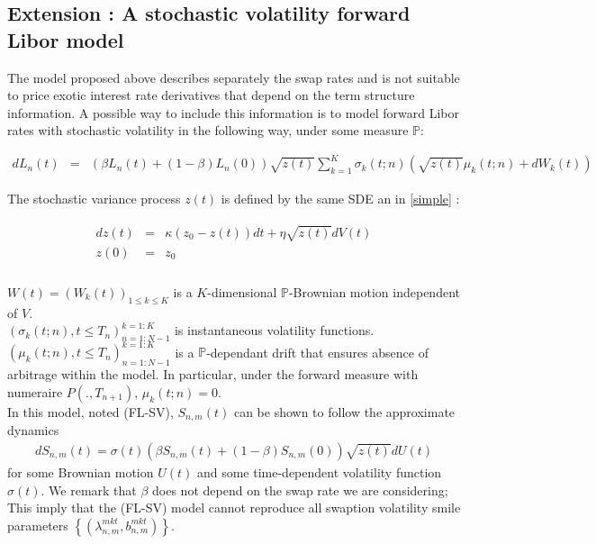 \documentclass[12pt,a4paper]{article}
\def\P{{\mathbb P}}
\begin{document}
\subsection{Extension : A stochastic volatility forward Libor model}

The model proposed above describes separately the swap rates and is not suitable to price exotic interest rate derivatives that depend on the term structure information. A possible way to include this information is to model forward Libor rates with stochastic volatility in the following way, under some measure $\P$:

\begin{eqnarray}
\label{FLSV}
d L_n(t)&=&\left(\beta L_n(t) + (1-\beta) L_n(0)\right) \sqrt{z(t)} \sum_{k=1}^{K}\sigma_k(t; n)\left(\sqrt{z(t)}\mu_k(t; n) + dW_k(t)\right)
\end{eqnarray}

The stochastic variance process $z(t)$ is defined by the same SDE an in \ref{simple} :

\begin{eqnarray*}
\begin{array}{rll}
  d z(t) &=& \kappa (z_0 - z(t)) dt + \eta \sqrt{z(t)} d V(t) \\
  z(0) &=& z_0 \\
\end{array}
\end{eqnarray*}

$W(t)= (W_k(t))_{1\leq k \leq K}$ is a $K$-dimensional $\P$-Brownian motion independent of $V$.\\

$\left( \sigma_k(t; n), t\leq T_n\right) ^{k=1:K}_{n=1:N-1}$ is instantaneous volatility functions.\\

$\left( \mu_k(t; n), t\leq T_n\right) ^{k=1:K}_{n=1:N-1}$ is a $\P$-dependant drift that ensures  absence of arbitrage within the model. In particular, under the forward measure with numeraire $P(.,T_{n+1})$, $\mu_k(t; n)=0$.\\

In this model, noted (FL-SV), $S_{n,m}(t)$ can be shown to follow the approximate dynamics 
\begin{eqnarray}
\label{appS_FLSV}
 d S_{n,m}(t) =  \sigma(t) \left( \beta S_{n,m}(t) + (1-\beta)S_{n,m}(0)\right)  \sqrt{z(t)} dU(t)
\end{eqnarray}
for some Brownian motion $U(t)$ and some time-dependent volatility function $\sigma(t)$. We remark that $\beta$ does not depend on the swap rate we are considering; This imply that the (FL-SV) model cannot reproduce all swaption volatility smile parameters $\left\lbrace (\lambda^{mkt}_{n,m}, b^{mkt}_{n,m})\right\rbrace$.\\
\end{document}
